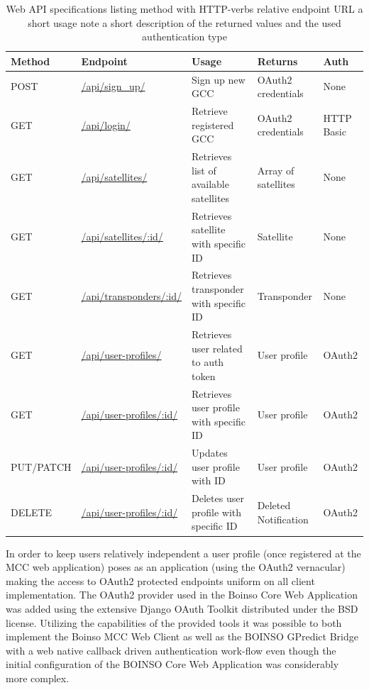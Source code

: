 \documentclass[BachelorPaper]{subfiles}
\begin{document}
\begin{table}[!htbp]
	\centering
	\begin{tabular}{| l | l | p{3.5cm} | l | l |}
		\hline
		Method & Endpoint & Usage & Returns & Auth \\ \hline
		POST & \url{/api/sign_up/} & Sign up new \ac{GCC} & OAuth2 credentials & None \\ \hline
		GET & \url{/api/login/} & Retrieve registered \ac{GCC} & OAuth2 credentials & HTTP Basic \\ \hline
		GET & \url{/api/satellites/} & Retrieves list of available satellites & Array of satellites & None \\ \hline
		GET & \url{/api/satellites/:id/} & Retrieves satellite with specific ID & Satellite & None \\ \hline
		GET & \url{/api/transponders/:id/} & Retrieves transponder with specific ID & Transponder & None \\ \hline
		GET & \url{/api/user-profiles/} & Retrieves user related to auth token & User profile & OAuth2 \\ \hline
		GET & \url{/api/user-profiles/:id/} & Retrieves user profile with specific ID & User profile & OAuth2 \\ \hline
		PUT/PATCH & \url{/api/user-profiles/:id/} & Updates user profile with ID & User profile & OAuth2 \\ \hline
		DELETE & \url{/api/user-profiles/:id/} & Deletes user profile with specific ID & Deleted Notification & OAuth2 \\ \hline
	\end{tabular}
	\caption{Web API specifications listing method with HTTP-verbs relative endpoint \ac{URL} a short usage note a short description of the returned values and the used authentication type}
	\label{tab:web_api_spec}
\end{table}

In order to keep users relatively independent a user profile (once registered at the \ac{MCC} web application) poses as an application (using the OAuth2 vernacular) making the access to OAuth2 protected endpoints uniform on all client implementation. The OAuth2 provider used in the Boinso Core Web Application was added using the extensive Django OAuth Toolkit distributed under the \ac{BSD} license. Utilizing the capabilities of the provided tools it was possible to both implement the Boinso MCC Web Client as well as the BOINSO GPredict Bridge with a web native callback driven authentication work-flow even though the initial configuration of the BOINSO Core Web Application was considerably more complex.\\
\end{document}
